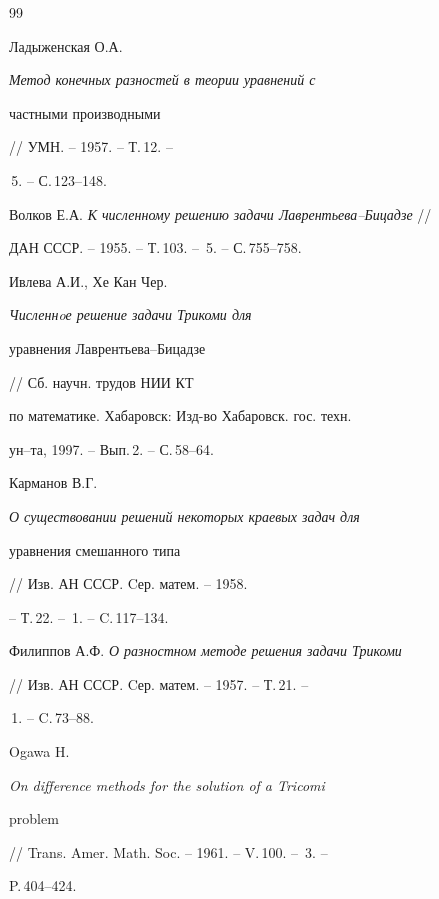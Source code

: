 \begin{thebibliography}{99}


Ладыженская О.А. {\em Метод конечных разностей в теории уравнений с


частными производными} // УМН. -- 1957. -- Т.\,12. -- 


\No\,5. -- С.\,123--148.







Волков Е.А. {\em К численному решению задачи Лаврентьева--Бицадзе} //


ДАН СССР. -- 1955. -- Т.\,103. -- \No\,5. -- С.\,755--758.







Ивлева А.И., Хе Кан Чер. {\em Численнoе решение задачи Трикоми для


уравнения Лаврентьева--Бицадзе} // Сб. научн. трудов НИИ КТ


по математике. Хабаровск: Изд-во Хабаровск. гос. техн. 


ун--та, 1997. -- Вып.\,2. -- С.\,58--64.







Карманов В.Г. {\em О существовании решений некоторых краевых задач для


уравнения смешанного типа} // Изв. АН СССР. Cер. матем. -- 1958.


-- Т.\,22. -- \No\,1. -- C.\,117--134.







Филиппов А.Ф. {\em О разностном методе решения задачи Трикоми}


// Изв. АН СССР. Cер. матем. -- 1957. -- Т.\,21. -- 


\No\,1. -- C.\,73--88.







Ogawa H. {\em On difference methods for the solution of a Tricomi


problem} // Trans. Amer. Math. Soc. -- 1961. -- V.\,100. -- \No\,3. --


P.\,404--424.








\end{thebibliography}
